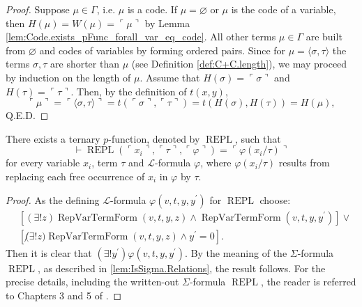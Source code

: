 \begin{proof}
    Suppose $\mu \in \Gamma$, i.e. $\mu$ is a code. 
    If $\mu=\varnothing$ or $\mu$ is the code of a variable,
    then $H(\mu) = W(\mu) = \ulcorner{\mu}\urcorner$ by 
    Lemma \ref{lem:Code.exists_pFunc_forall_var_eq_code}.
    All other terms $\mu \in \Gamma$ are built from $\varnothing$ and codes of variables by
    forming ordered pairs.
    Since for $\mu = \langle \sigma, \tau \rangle$ the terms $\sigma,\tau$ are shorter than $\mu$
    (see Definition \ref{def:C+C.length}), we may proceed by induction on the length of $\mu$.
    Assume that $H(\sigma) = \ulcorner{\sigma}\urcorner$ and $H(\tau) = \ulcorner{\tau}\urcorner$.
    Then, by the definition of $t(x,y)$,
    $$
    \ulcorner{\mu}\urcorner = \ulcorner {\langle \sigma, \tau \rangle} \urcorner =
    t(\ulcorner{\sigma}\urcorner, \ulcorner{\tau}\urcorner) = t(H(\sigma), H(\tau)) = H(\mu),
    $$
    Q.E.D.
\end{proof}

\begin{lemma}
    \label{lem:Code.exists_repl}
    There exists a ternary $p$-function, denoted by $\operatorname{REPL}$, such that
    $$
    \vdash \operatorname{REPL}(\ulcorner{x_i}\urcorner, \ulcorner{\tau}\urcorner, 
    \ulcorner{\varphi}\urcorner) = \ulcorner{\varphi(x_i/\tau)}\urcorner
    $$
    for every variable $x_i$, term $\tau$ and $\mathcal{L}$-formula $\varphi$, where
    $\varphi(x_i/\tau)$ results from replacing each free occurrence of $x_i$ in $\varphi$ by $\tau$.
\end{lemma}

\begin{proof}
    As the defining $\mathcal{L}$-formula $\varphi(v,t,y,y^\prime)$ for $\operatorname{REPL}$ 
    choose:
    \begin{equation*}
        \begin{split}
    & [(\exists!z)\operatorname{RepVarTermForm}(v,t,y,z) \land 
    \operatorname{RepVarTermForm}(v,t,y,y^\prime)] \lor \\
    & [\not (\exists!z)\operatorname{RepVarTermForm}(v,t,y,z) \land y^\prime = 0].
        \end{split}
    \end{equation*}
    Then it is clear that $(\exists!y^\prime)\varphi(v,t,y,y^\prime)$.
    By the meaning of the $\Sigma$-formula $\operatorname{REPL}$, as described in
    \ref{lem:IsSigma.Relations}, the result follows.
    For the precise details, including the written-out $\Sigma$-formula $\operatorname{REPL}$,
    the reader is referred to Chapters 3 and 5 of \cite{swierczkowski2003finite}.
\end{proof}

